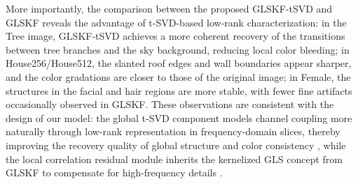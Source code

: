 \documentclass[a4paper,12pt]{article}
\numberwithin{equation}{section}
\numberwithin{algorithm}{section}
\theoremstyle{remark}
\theoremstyle{definition}
\begin{document}
More importantly, the comparison between the proposed GLSKF-tSVD and GLSKF reveals the advantage of t-SVD-based low-rank characterization: in the Tree image, GLSKF-tSVD achieves a more coherent recovery of the transitions between tree branches and the sky background, reducing local color bleeding; in House256/House512, the slanted roof edges and wall boundaries appear sharper, and the color gradations are closer to those of the original image; in Female, the structures in the facial and hair regions are more stable, with fewer fine artifacts occasionally observed in GLSKF. These observations are consistent with the design of our model: the global t-SVD component models channel coupling more naturally through low-rank representation in frequency-domain slices, thereby improving the recovery quality of global structure and color consistency \cite{kilmer2013operators}, while the local correlation residual module inherits the kernelized GLS concept from GLSKF to compensate for high-frequency details \cite{lei2024glskf}.
\end{document}
